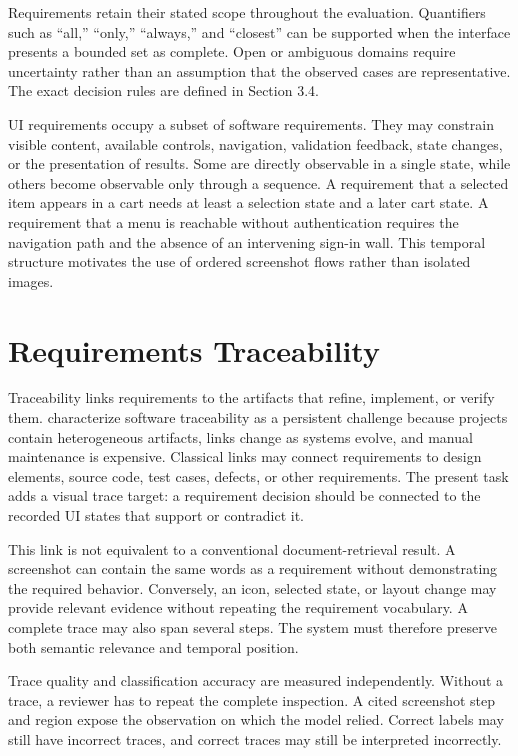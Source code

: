 Requirements retain their stated scope throughout the evaluation. Quantifiers
such as ``all,'' ``only,'' ``always,'' and ``closest'' can be supported when the
interface presents a bounded set as complete. Open or ambiguous domains require
uncertainty rather than an assumption that the observed cases are
representative. The exact decision rules are defined in Section 3.4.

UI requirements occupy a subset of software requirements.
They may constrain visible content, available controls, navigation, validation
feedback, state changes, or the presentation of results. Some are directly
observable in a single state, while others become observable only through a
sequence. A requirement that a selected item appears in a cart needs at least a
selection state and a later cart state. A requirement that a menu is reachable
without authentication requires the navigation path and the absence of an
intervening sign-in wall. This temporal structure motivates the use of ordered
screenshot flows rather than isolated images.

\section{Requirements Traceability}\label{requirements-traceability}

Traceability links requirements to the artifacts that refine, implement, or
verify them. \textcite{clelandhuang2014} characterize software traceability as a
persistent challenge because projects contain heterogeneous artifacts, links
change as systems evolve, and manual maintenance is expensive. Classical links
may connect requirements to design elements, source code, test cases, defects,
or other requirements. The present task adds a visual trace target: a
requirement decision should be connected to the recorded UI states that support
or contradict it.

This link is not equivalent to a conventional document-retrieval result. A
screenshot can contain the same words as a requirement without demonstrating
the required behavior. Conversely, an icon, selected state, or layout change may
provide relevant evidence without repeating the requirement vocabulary. A
complete trace may also span several steps. The system must therefore preserve
both semantic relevance and temporal position.

Trace quality and classification accuracy are measured independently. Without
a trace, a reviewer has to repeat the complete inspection. A cited screenshot
step and region expose the observation on which the model relied. Correct
labels may still have incorrect traces, and correct traces may still be
interpreted incorrectly.


